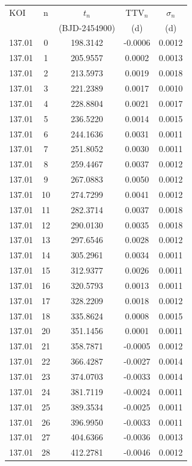 {\footnotesize
\begin{longtable}{lcccc} 
\hline
KOI & n & $t_n$ & TTV$_n$ & $\sigma_n$ \\
    &   & (BJD-2454900) & (d) & (d) \\
\hline
137.01 & 0 & 198.3142 & -0.0006 &  0.0012 \\
137.01 & 1 & 205.9557 &  0.0002 &  0.0013 \\
137.01 & 2 & 213.5973 &  0.0019 &  0.0018 \\
137.01 & 3 & 221.2389 &  0.0017 &  0.0010 \\
137.01 & 4 & 228.8804 &  0.0021 &  0.0017 \\
137.01 & 5 & 236.5220 &  0.0014 &  0.0015 \\
137.01 & 6 & 244.1636 &  0.0031 &  0.0011 \\
137.01 & 7 & 251.8052 &  0.0030 &  0.0011 \\
137.01 & 8 & 259.4467 &  0.0037 &  0.0012 \\
137.01 & 9 & 267.0883 &  0.0050 &  0.0012 \\
137.01 & 10 & 274.7299 &  0.0041 &  0.0012 \\
137.01 & 11 & 282.3714 &  0.0037 &  0.0018 \\
137.01 & 12 & 290.0130 &  0.0035 &  0.0018 \\
137.01 & 13 & 297.6546 &  0.0028 &  0.0012 \\
137.01 & 14 & 305.2961 &  0.0034 &  0.0011 \\
137.01 & 15 & 312.9377 &  0.0026 &  0.0011 \\
137.01 & 16 & 320.5793 &  0.0013 &  0.0011 \\
137.01 & 17 & 328.2209 &  0.0018 &  0.0012 \\
137.01 & 18 & 335.8624 &  0.0008 &  0.0015 \\
137.01 & 20 & 351.1456 &  0.0001 &  0.0011 \\
137.01 & 21 & 358.7871 & -0.0005 &  0.0012 \\
137.01 & 22 & 366.4287 & -0.0027 &  0.0014 \\
137.01 & 23 & 374.0703 & -0.0033 &  0.0014 \\
137.01 & 24 & 381.7119 & -0.0024 &  0.0011 \\
137.01 & 25 & 389.3534 & -0.0025 &  0.0011 \\
137.01 & 26 & 396.9950 & -0.0033 &  0.0011 \\
137.01 & 27 & 404.6366 & -0.0036 &  0.0013 \\
137.01 & 28 & 412.2781 & -0.0046 &  0.0012 \\

\end{longtable}}

